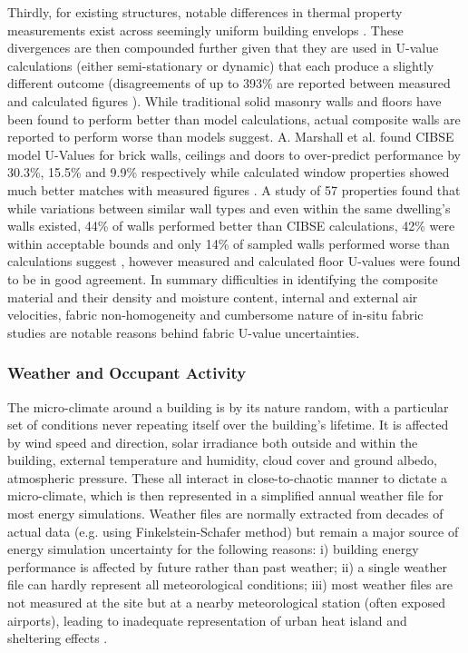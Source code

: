 \documentclass[preprint,12pt, sort&compress]{elsarticle}
\begin{document}
Thirdly, for existing structures, notable differences in thermal property measurements exist across seemingly uniform building envelops \cite{rasooli2016, deconinck2016, meng2015, ficco2015}. These divergences are then compounded further given that they are used in U-value calculations (either semi-stationary or dynamic) that each produce a slightly different outcome \cite{deconinck2016} (disagreements of up to 393\% are reported between measured and calculated figures \cite{rasooli2016}). While traditional solid masonry walls \cite{gaspar2016, desogus2011} and floors \cite{hoffmann2017} have been found to perform better than model calculations, actual composite walls are reported to perform worse than models suggest. A. Marshall et al. found CIBSE model U-Values for brick walls, ceilings and doors to over-predict performance by 30.3\%, 15.5\% and 9.9\% respectively while calculated window properties showed much better matches with measured figures \cite{marshall2017}. A study of 57 properties found that while variations between similar wall types and even within the same dwelling’s walls existed, 44\% of walls performed better than CIBSE calculations, 42\% were within acceptable bounds and only 14\% of sampled walls performed worse than calculations suggest \cite{baker2011}, however measured and calculated floor U-values were found to be in good agreement. In summary difficulties in identifying the composite material and their density and moisture content, internal and external air velocities, fabric non-homogeneity and cumbersome nature of in-situ fabric studies are notable reasons behind fabric U-value uncertainties. 

\subsubsection{Weather and Occupant Activity}
The micro-climate around a building is by its nature random, with a particular set of conditions never repeating itself over the building’s lifetime. It is affected by wind speed and direction, solar irradiance both outside and within the building, external temperature and humidity, cloud cover and ground albedo, atmospheric pressure. These all interact in close-to-chaotic manner to dictate a micro-climate, which is then represented in a simplified annual weather file for most energy simulations. Weather files are normally extracted from decades of actual data (e.g. using Finkelstein-Schafer method) but remain a major source of energy simulation uncertainty for the following reasons: i) building energy performance is affected by future rather than past weather; ii) a single weather file can hardly represent all meteorological conditions; iii) most weather files are not measured at the site but at a nearby meteorological station (often exposed airports), leading to inadequate representation of urban heat island and sheltering effects \cite{yassaghi2019}.
\end{document}
